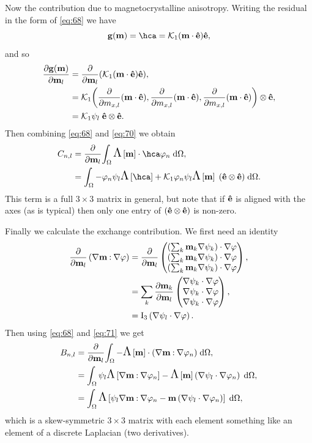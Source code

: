 Now the contribution due to magnetocrystalline anisotropy.
Writing the residual in the form of \eqref{eq:68} we have 
\begin{equation}
  \gv(\mv) = \hca = \kone (\mv \cdot \ev) \ev,  
\end{equation}
and so 
\begin{equation}
  \begin{aligned}
    \frac{\partial {\mathbf{g}}(\mathbf{m})}{\partial \mathbf{m}_l} &= \frac{\partial }{\partial \mathbf{m}_l} {\left(  \mathcal{K}_1 (\mathbf{m} \cdot \mathbf{\hat{e}}) \mathbf{\hat{e}} \right)}, \\
    &= \mathcal{K}_1 {\left(  \frac{\partial }{\partial m_{x,l}} (\mathbf{m} \cdot \mathbf{\hat{e}}), 
      \frac{\partial }{\partial m_{x,l}} (\mathbf{m} \cdot \mathbf{\hat{e}}),
      \frac{\partial }{\partial m_{x,l}} (\mathbf{m} \cdot \mathbf{\hat{e}})  \right)}  \otimes \mathbf{\hat{e}}, \\
    &= \mathcal{K}_1 \psi_l \; \mathbf{\hat{e}}  \otimes \mathbf{\hat{e}}.
    \label{eq:70}
  \end{aligned}
\end{equation}
Then combining \eqref{eq:68} and \eqref{eq:70} we obtain
\begin{equation}
  \begin{aligned} 
    C_{n,l} &= \pd{}{\mv_l} \intd{ \skewm{\mv} \cdot \hca  \tbf_n}, \\
    &= \intd{ -\tbf_n \sbf_l\skewm{\hca} 
       + \kone \tbf_n \sbf_l \skewm{\mv} \; (\ev  \tensorprod \ev) }.
  \end{aligned}
\end{equation}
This term is a full $3\times3$ matrix in general, but note that if $\mathbf{\hat{e}}$ is aligned with the axes (as is typical) then only one entry of $(\mathbf{\hat{e}}  \otimes \mathbf{\hat{e}})$ is non-zero.

Finally we calculate the exchange contribution.
We first need an identity
\begin{equation}
  \begin{aligned}
    \frac{\partial }{\partial \mathbf{m}_l} \left(\nabla \mathbf{m} \mathbin{:} \nabla \varphi\right) 
    &= \frac{\partial }{\partial \mathbf{m}_l} \begin{pmatrix} \left( \sum_k \mathbf{m}_k \nabla \psi_k \right) \cdot \nabla \varphi \\ \left( \sum_k \mathbf{m}_k \nabla \psi_k \right) \cdot \nabla \varphi \\ \left( \sum_k \mathbf{m}_k \nabla \psi_k \right) \cdot \nabla \varphi \end{pmatrix}, \\
    &=  \sum_k \frac{\partial \mathbf{m}_k}{\partial \mathbf{m}_l} \begin{pmatrix} \nabla \psi_k \cdot \nabla \varphi \\ \nabla \psi_k \cdot \nabla \varphi \\ \nabla \psi_k \cdot \nabla \varphi \end{pmatrix}, \\
    &=  \mathrm{I}_3 \left(\nabla \psi_l \cdot \nabla \varphi \right).
    \label{eq:71}
  \end{aligned}
\end{equation}
Then using \eqref{eq:68} and \eqref{eq:71} we get
\begin{equation}
  \begin{aligned}
    B_{n,l} &=  \frac{\partial }{\partial \mathbf{m}_l} {\int_{\Omega} - \text{\Large{$\Lambda$}}\left[ \mathbf{m} \right] \cdot (\nabla \mathbf{m} \mathbin{:} \nabla \varphi_n) {\; \text{d}} {\Omega}} ,\\
    &= {\int_{\Omega}  \psi_l \text{\Large{$\Lambda$}}\left[ \nabla \mathbf{m} \mathbin{:} \nabla \varphi_n \right]
       - \text{\Large{$\Lambda$}}\left[ \mathbf{m} \right] \left( \nabla \psi_l \cdot \nabla \varphi_n \right) {\; \text{d}} {\Omega}}, \\
     &= {\int_{\Omega} \text{\Large{$\Lambda$}}\left[  \psi_l \nabla \mathbf{m} \mathbin{:} \nabla \varphi_n
       - \mathbf{m} \left( \nabla \psi_l \cdot \nabla \varphi_n \right) \right] {\; \text{d}} {\Omega}},
   \end{aligned}
 \end{equation}
which is a skew-symmetric $3\times 3$ matrix with each element something like an element of a  discrete Laplacian (\ie two derivatives). 

